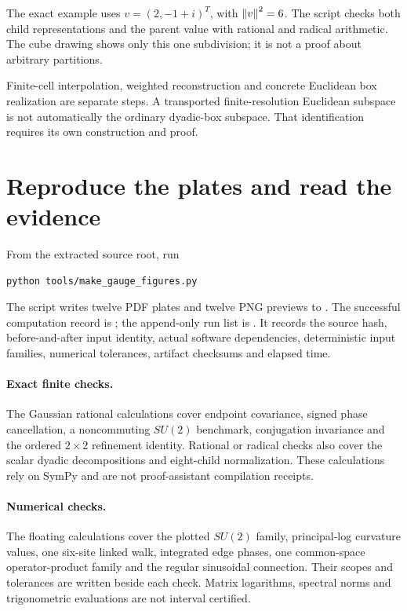 The exact example uses $v=(2,-1+i)^T$, with $\left\lVert v\right\rVert^2=6$. The script checks both child representations and the parent value with rational and radical arithmetic. The cube drawing shows only this one subdivision; it is not a proof about arbitrary partitions.

Finite-cell interpolation, weighted reconstruction and concrete Euclidean box realization are separate steps. A transported finite-resolution Euclidean subspace is not automatically the ordinary dyadic-box subspace. That identification requires its own construction and proof.



\clearpage
\section{Reproduce the plates and read the evidence}

From the extracted source root, run
\begin{verbatim}
python tools/make_gauge_figures.py
\end{verbatim}
The script writes twelve PDF plates and twelve PNG previews to . The successful computation record is ; the append-only run list is . It records the source hash, before-and-after input identity, actual software dependencies, deterministic input families, numerical tolerances, artifact checksums and elapsed time.

\paragraph{Exact finite checks.}
The Gaussian rational calculations cover endpoint covariance, signed phase cancellation, a noncommuting $SU(2)$ benchmark, conjugation invariance and the ordered $2\times2$ refinement identity. Rational or radical checks also cover the scalar dyadic decompositions and eight-child normalization. These calculations rely on SymPy and are not proof-assistant compilation receipts.

\paragraph{Numerical checks.}
The floating calculations cover the plotted $SU(2)$ family, principal-log curvature values, one six-site linked walk, integrated edge phases, one common-space operator-product family and the regular sinusoidal connection. Their scopes and tolerances are written beside each check. Matrix logarithms, spectral norms and trigonometric evaluations are not interval certified.

